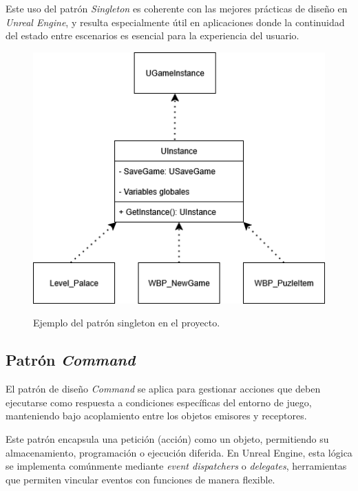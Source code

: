 Este uso del patrón \textit{Singleton} es coherente con las mejores prácticas de diseño en \textit{Unreal Engine}, y resulta especialmente útil en aplicaciones donde la continuidad del estado entre escenarios es esencial para la experiencia del usuario.

\begin{figure}[h]
	\caption[Ejemplo de singleton]{Ejemplo del patrón singleton en el proyecto.}
	\centering
	\includegraphics[width=\textwidth]{../img/anexos/ejemplo_singleton.png}
	\label{b:ejemplo_singleton}
\end{figure}

\subsection{Patrón \textit{Command}}

El patrón de diseño \textit{Command} se aplica para gestionar acciones que deben ejecutarse como respuesta a condiciones específicas del entorno de juego, manteniendo bajo acoplamiento entre los objetos emisores y receptores.

Este patrón encapsula una petición (acción) como un objeto, permitiendo su almacenamiento, programación o ejecución diferida. En Unreal Engine, esta lógica se implementa comúnmente mediante \textit{event dispatchers} o \textit{delegates}, herramientas que permiten vincular eventos con funciones de manera flexible.

